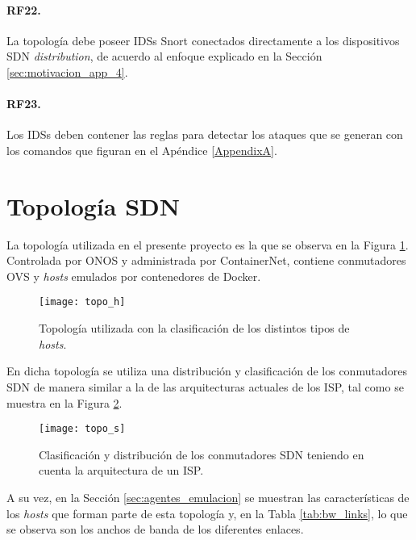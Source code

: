 \paragraph{RF22.} La topología debe poseer IDSs Snort conectados directamente a
los dispositivos SDN \textit{distribution}, de acuerdo al enfoque explicado en
la Sección \ref{sec:motivacion_app_4}.

\paragraph{RF23.} Los IDSs deben contener las reglas para detectar los ataques
que se generan con los comandos que figuran en el Apéndice \ref{AppendixA}. \\

\section {Topología SDN}

La topología utilizada en el presente proyecto es la que se observa en la Figura
\ref{fig:topologia_final}. Controlada por ONOS y administrada por ContainerNet, contiene conmutadores OVS y
\textit{hosts} emulados por contenedores de Docker.\\ %

\begin{figure}[H]
	\centering 
	\texttt{[image: topo\_h]}
	\caption{Topología utilizada con la clasificación de los distintos tipos de
    \textit{hosts}.}
	\label{fig:topologia_final}
\end{figure}

En dicha topología se utiliza una distribución y clasificación de los
conmutadores SDN de manera similar a la de las arquitecturas actuales de los
ISP, tal como se muestra en la Figura \ref{fig:ovs_classif}. \\

\begin{figure}[H]
	\centering 
	\texttt{[image: topo\_s]}
	\caption{Clasificación y distribución de los conmutadores SDN teniendo en
    cuenta la arquitectura de un ISP.}
	\label{fig:ovs_classif}
\end{figure}

A su vez, en la Sección \ref{sec:agentes_emulacion} se muestran las
características de los \textit{hosts} que forman parte de esta topología y, en
la Tabla \ref{tab:bw_links}, lo que se observa son los anchos de banda de los
diferentes enlaces.

